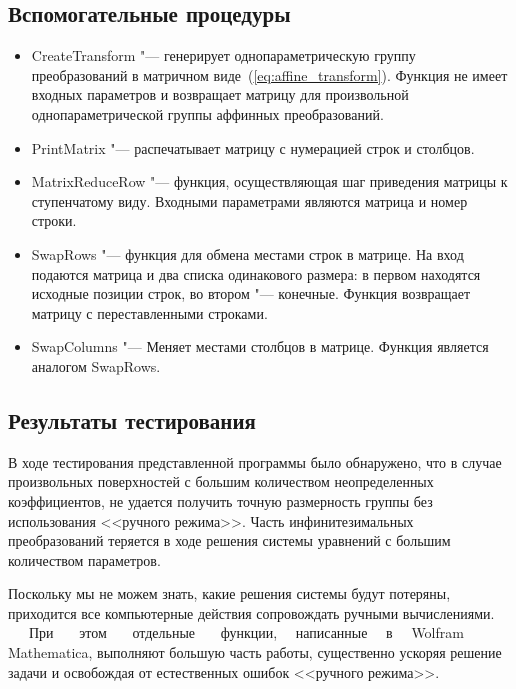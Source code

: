 \documentclass[../main.tex]{subfiles}
\begin{document}
\subsection{Вспомогательные процедуры}
\begin{itemize}
\item {\ttfamily CreateTransform} "--- генерирует однопараметрическую группу преобразований в матричном виде~(\ref{eq:affine_transform}). Функция не имеет входных параметров и возвращает матрицу для произвольной однопараметрической группы аффинных преобразований.

\item {\ttfamily PrintMatrix} "--- распечатывает матрицу с нумерацией строк и столбцов.

\item {\ttfamily MatrixReduceRow} "--- функция, осуществляющая шаг приведения матрицы к ступенчатому виду. Входными параметрами являются матрица и номер строки.

\item {\ttfamily SwapRows} "--- функция для обмена местами строк в матрице. На вход подаются матрица и два списка одинакового размера: в первом находятся исходные позиции строк, во втором "--- конечные. Функция возвращает матрицу с переставленными строками.

\item {\ttfamily SwapColumns} "--- Меняет местами столбцов в матрице. Функция является аналогом {\ttfamily SwapRows}.

\end{itemize}

\subsection{Результаты тестирования}
В ходе тестирования представленной программы было обнаружено, что в случае произвольных поверхностей с большим количеством неопределенных коэффициентов, не удается получить точную размерность группы без использования <<ручного режима>>. Часть инфинитезимальных преобразований теряется в ходе решения системы уравнений с большим количеством параметров.

Поскольку мы не можем знать, какие решения системы будут потеряны, приходится все компьютерные действия сопровождать ручными вычислениями. ~~~При ~~~этом ~~~отдельные ~~~функции, ~~написанные ~~в ~~{\ttfamily Wolfram\\ Mathematica}, выполняют большую часть работы, существенно ускоряя решение задачи и освобождая от естественных ошибок <<ручного режима>>.
\end{document}

